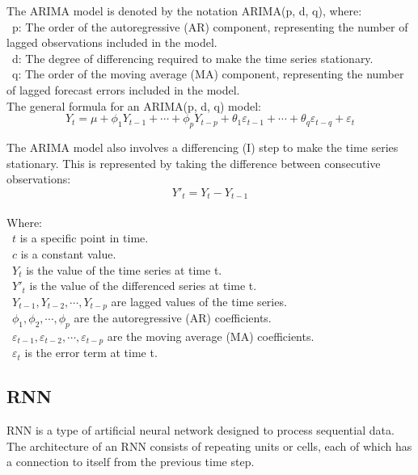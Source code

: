 \documentclass{ieeeojies}
\begin{document}
The ARIMA model is denoted by the notation ARIMA(p, d, q), where:\\
    \indent\textbullet\ p: The order of the autoregressive (AR) component, representing the number of lagged observations included in the model.\\
    \indent\textbullet\ d: The degree of differencing required to make the time series stationary.\\
    \indent\textbullet\ q: The order of the moving average (MA) component, representing the number of lagged forecast errors included in the model.\\
    
The general formula for an ARIMA(p, d, q) model:
    \[ Y_t = \mu + \phi_1 Y_{t-1} + \cdots + \phi_p Y_{t-p} + \theta_1 \varepsilon_{t-1} + \cdots + \theta_q \varepsilon_{t-q} + \varepsilon_t \]

The ARIMA model also involves a differencing (I) step to make the time series stationary. This is represented by taking the difference between consecutive observations:
    \[ Y'_t = Y_t - Y_{t-1} \]
\\
Where:\\
    \indent\ \(t\) is a specific point in time.\\
    \indent\ \(c\) is a constant value.\\
    \indent\ \(Y_t\) is the value of the time series at time t.\\
    \indent\ \(Y'_t\) is the value of the differenced series at time t.\\
    \indent\ \( Y_{t-1}, Y_{t-2}, \cdots, Y_{t-p} \) are lagged values of the time series.\\
    \indent\ \( \phi_1, \phi_2, \cdots, \phi_p \) are the autoregressive (AR) coefficients.\\
    \indent\ \( \varepsilon_{t-1}, \varepsilon_{t-2}, \cdots, \varepsilon_{t-p} \) are the moving average (MA) coefficients.\\
    \indent\ \( \varepsilon_t \) is the error term at time t.

\subsection{RNN}
RNN \cite{b5} is a type of artificial neural network designed to process sequential data. The architecture of an RNN consists of repeating units or cells, each of which has a connection to itself from the previous time step.\\
\end{document}
